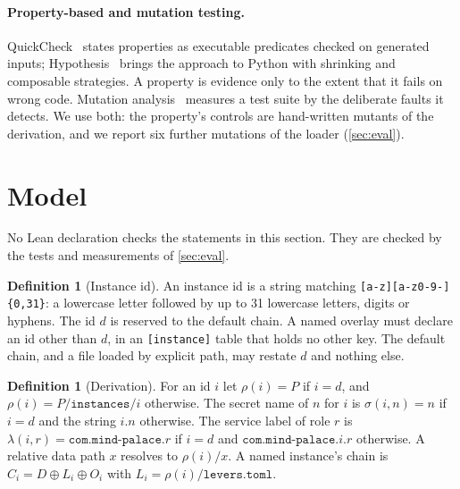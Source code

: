\documentclass[11pt]{article}
\theoremstyle{plain}
\theoremstyle{definition}
\newtheorem{definition}[theorem]{Definition}
\theoremstyle{remark}
\begin{document}
\paragraph{Property-based and mutation testing.} QuickCheck~\cite{claessen2000} states properties as
executable predicates checked on generated inputs; Hypothesis~\cite{maciver2019} brings the approach
to Python with shrinking and composable strategies. A property is evidence only to the extent that it
fails on wrong code. Mutation analysis~\cite{demillo1978} measures a test suite by the deliberate
faults it detects. We use both: the property's controls are hand-written mutants of the derivation,
and we report six further mutations of the loader (\cref{sec:eval}).

\section{Model}\label{sec:model}

No Lean declaration checks the statements in this section. They are checked by the tests and
measurements of \cref{sec:eval}.

\begin{definition}[Instance id]
An instance id is a string matching \texttt{[a-z][a-z0-9-]\{0,31\}}: a lowercase letter followed by
up to 31 lowercase letters, digits or hyphens. The id $d$ is reserved to the default chain. A named
overlay must declare an id other than $d$, in an \texttt{[instance]} table that holds no other key.
The default chain, and a file loaded by explicit path, may restate $d$ and nothing else.
\end{definition}

\begin{definition}[Derivation]
For an id $i$ let $\rho(i) = P$ if $i = d$, and $\rho(i) = P/\texttt{instances}/i$ otherwise. The
secret name of $n$ for $i$ is $\sigma(i, n) = n$ if $i = d$ and the string $i.n$ otherwise. The
service label of role $r$ is $\lambda(i, r) = \texttt{com.mind-palace.}r$ if $i = d$ and
$\texttt{com.mind-palace.}i.r$ otherwise. A relative data path $x$ resolves to $\rho(i)/x$. A named
instance's chain is $C_i = D \oplus L_i \oplus O_i$ with $L_i = \rho(i)/\texttt{levers.toml}$.
\end{definition}
\end{document}
